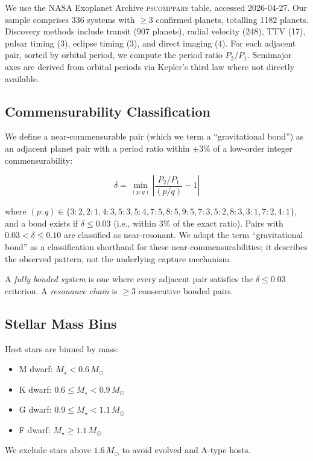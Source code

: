 \documentclass[twocolumn,usenatbib]{mnras}
\begin{document}
We use the NASA Exoplanet Archive \textsc{pscomppars} table, accessed
2026-04-27. Our sample comprises 336 systems with $\geq 3$ confirmed planets,
totalling 1182 planets. Discovery methods include transit (907 planets),
radial velocity (248), TTV (17), pulsar timing (3), eclipse timing (3), and
direct imaging (4). For each adjacent pair, sorted by orbital period, we
compute the period ratio $P_2/P_1$. Semimajor axes are derived from orbital
periods via Kepler's third law where not directly available.

\subsection{Commensurability Classification}

We define a near-commensurable pair (which we term a
``gravitational bond'') as an adjacent planet pair with a period ratio within
$\pm 3\%$ of a low-order integer commensurability:

\begin{equation}
\delta = \min_{(p:q)} \left| \frac{P_2/P_1}{(p/q)} - 1 \right|
\label{eq:delta}
\end{equation}

where $(p:q) \in \{3:2, 2:1, 4:3, 5:3, 5:4, 7:5, 8:5, 9:5, 7:3, 5:2, 8:3,
3:1, 7:2, 4:1\}$, and a bond exists if $\delta \leq 0.03$ (i.e., within 3\%
of the exact ratio). Pairs with $0.03 < \delta \leq 0.10$ are classified as
near-resonant. We adopt the term ``gravitational bond'' as a classification
shorthand for these near-commensurabilities; it describes the observed pattern,
not the underlying capture mechanism.

A \textit{fully bonded system} is one where every adjacent pair satisfies the
$\delta \leq 0.03$ criterion. A \textit{resonance chain} is $\geq 3$
consecutive bonded pairs.

\subsection{Stellar Mass Bins}

Host stars are binned by mass:
\begin{itemize}
  \item M dwarf: $M_\star < 0.6\,M_\odot$
  \item K dwarf: $0.6 \leq M_\star < 0.9\,M_\odot$
  \item G dwarf: $0.9 \leq M_\star < 1.1\,M_\odot$
  \item F dwarf: $M_\star \geq 1.1\,M_\odot$
\end{itemize}
We exclude stars above $1.6\,M_\odot$ to avoid evolved and A-type hosts.
\end{document}
